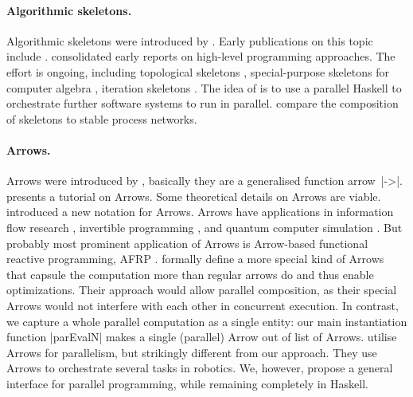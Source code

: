 \paragraph{Algorithmic skeletons.}
Algorithmic skeletons were introduced by \citet{Cole1989}.
Early publications on this topic include \cite{darlington1993parallel,botorog1996efficient,p3l97,Gorlatch1998,Lengauer1997}. \citet{SkeletonBook} consolidated early reports on high-level programming approaches.
The effort is ongoing, including topological skeletons \cite{Eden:PARCO05}, special-purpose skeletons for computer algebra \cite{Berthold2009-fft,lobachev-phd,Lobachev2012,janjic2013space}, iteration skeletons \cite{Dieterle2013}. The idea of \citet{scscp} is to use a parallel Haskell to orchestrate further software systems to run in parallel. \citet{dieterle_horstmeyer_loogen_berthold_2016} compare the composition of skeletons to stable process networks.

\paragraph{Arrows.}
Arrows were introduced by \citet{HughesArrows}, basically they are a generalised function arrow~|->|. \citet{Hughes2005} presents a tutorial on Arrows. Some theoretical details on Arrows \cite{jacobs_heunen_hasuo_2009,LINDLEY201197,ATKEY201119} are viable. \citet{Paterson:2001:NNA:507669.507664} introduced a new notation for Arrows. Arrows have applications in information flow research \cite{1648705,LI20101974,Russo:2008:LLI:1411286.1411289}, invertible programming \cite{Alimarine:2005:BAA:1088348.1088357}, and quantum computer simulation \cite{vizzotto_altenkirch_sabry_2006}. But probably most prominent application of Arrows is Arrow-based functional reactive programming, AFRP \cite{Nilsson:2002:FRP:581690.581695,Hudak2003,Czaplicki:2013:AFR:2499370.2462161}.
\citet{Liu:2009:CCA:1631687.1596559} formally define a more special kind of Arrows that capsule the computation more than regular arrows do and thus enable optimizations. Their approach would allow parallel composition, as their special Arrows would not interfere with each other in concurrent execution. In contrast, we capture a whole parallel computation as a single entity: our main instantiation function |parEvalN| makes a single (parallel) Arrow out of list of Arrows. \citet{Huang2007} utilise Arrows for parallelism, but strikingly different from our approach. They use Arrows to orchestrate several tasks in robotics. We, however, propose a general interface for parallel programming, while remaining completely in Haskell.

